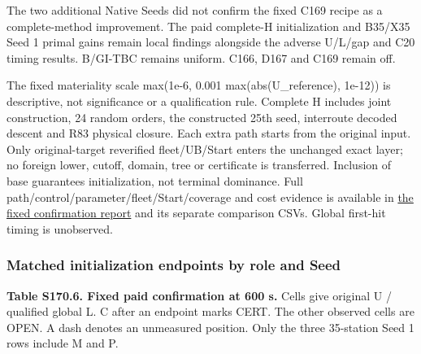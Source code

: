 \documentclass[
  american,
  11pt,
]{article}
\begin{document}
The two additional Native Seeds did not confirm the fixed C169 recipe as
a complete-method improvement. The paid complete-H initialization and
B35/X35 Seed 1 primal gains remain local findings alongside the adverse
U/L/gap and C20 timing results. B/GI-TBC remains uniform. C166, D167 and
C169 remain off.

The fixed materiality scale max(1e-6, 0.001 max(abs(U\_\allowbreak{}reference),
1e-12)) is descriptive, not significance or a qualification rule.
Complete H includes joint construction, 24 random orders, the
constructed 25th seed, interroute decoded descent and R83 physical
closure. Each extra path starts from the original input. Only
original-target reverified fleet/UB/Start enters the unchanged exact
layer; no foreign lower, cutoff, domain, tree or certificate is
transferred. Inclusion of base guarantees initialization, not terminal
dominance. Full path/control/parameter/fleet/Start/coverage and cost
evidence is available in
\href{https://github.com/yifanXovo/TailoredExact/blob/codex/round170-reweight-confirmation/results/unified_exact_round170/final_report.md}{the
fixed confirmation report} and its separate comparison CSVs. Global
first-hit timing is unobserved.


\subsubsection{Matched initialization endpoints by role and
Seed}\label{matched-initialization-endpoints-by-role-and-seed}

\textbf{Table S170.6. Fixed paid confirmation at 600 s.} Cells give
original U / qualified global L. C after an endpoint marks CERT. The
other observed cells are OPEN. A dash denotes an unmeasured position.
Only the three 35-station Seed 1 rows include M and P.
\end{document}
